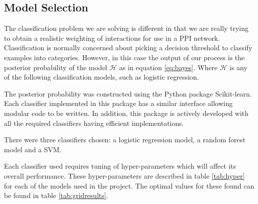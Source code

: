\subsection{Model Selection}

The classification problem we are solving is different in that we are really trying to obtain a realistic weighting of interactions for use in a \ac{PPI} network.
Classification is normally concerned about picking a decision threshold to classify examples into categories.
However, in this case the output of our process is the posterior probability of the model $\mathcal{H}$ as in equation \ref{eq:bayes}.
Where $\mathcal{H}$ is any of the following classification models, such as logistic regression.

The posterior probability was constructed using the Python package Scikit-learn\autocite{pedregosa_scikit-learn:_2011}.
Each classifier implemented in this package has a similar interface allowing modular code to be written.
In addition, this package is actively developed with all the required classifiers having efficient implementations.

There were three classifiers chosen: a logistic regression model, a random forest model and a \ac{SVM}.

Each classifier used requires tuning of hyper-parameters which will affect its overall performance.
These hyper-parameters are described in table \ref{tab:hyper} for each of the models used in the project.
The optimal values for these found can be found in table \ref{tab:gridresults}.

